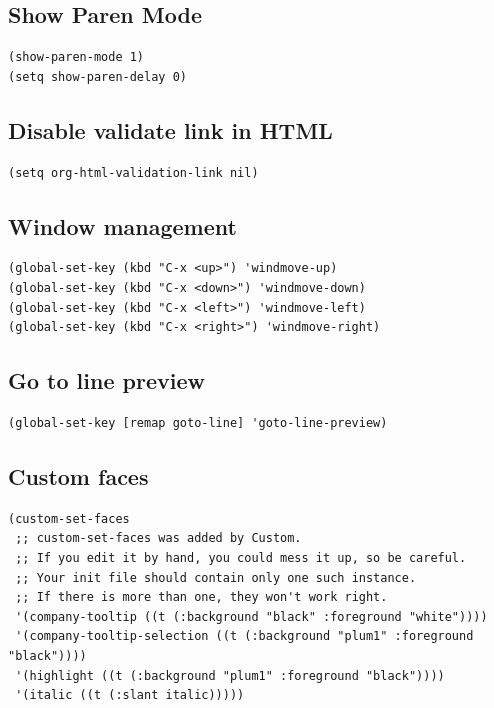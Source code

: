 \documentclass[10pt]{article}
\begin{document}
\subsection{Show Paren Mode}
\label{sec:org646a200}
\begin{verbatim}
(show-paren-mode 1)
(setq show-paren-delay 0)
\end{verbatim}
\subsection{Disable validate link in HTML}
\label{sec:orgc891aa3}
\begin{verbatim}
(setq org-html-validation-link nil)
\end{verbatim}
\subsection{Window management}
\label{sec:org3cb621c}
\begin{verbatim}
(global-set-key (kbd "C-x <up>") 'windmove-up)
(global-set-key (kbd "C-x <down>") 'windmove-down)
(global-set-key (kbd "C-x <left>") 'windmove-left)
(global-set-key (kbd "C-x <right>") 'windmove-right)
\end{verbatim}
\subsection{Go to line preview}
\label{sec:orgf921b54}
\begin{verbatim}
(global-set-key [remap goto-line] 'goto-line-preview)
\end{verbatim}
\subsection{Custom faces}
\label{sec:org762d0c0}
\begin{verbatim}
(custom-set-faces
 ;; custom-set-faces was added by Custom.
 ;; If you edit it by hand, you could mess it up, so be careful.
 ;; Your init file should contain only one such instance.
 ;; If there is more than one, they won't work right.
 '(company-tooltip ((t (:background "black" :foreground "white"))))
 '(company-tooltip-selection ((t (:background "plum1" :foreground "black"))))
 '(highlight ((t (:background "plum1" :foreground "black"))))
 '(italic ((t (:slant italic)))))

\end{verbatim}
\end{document}
